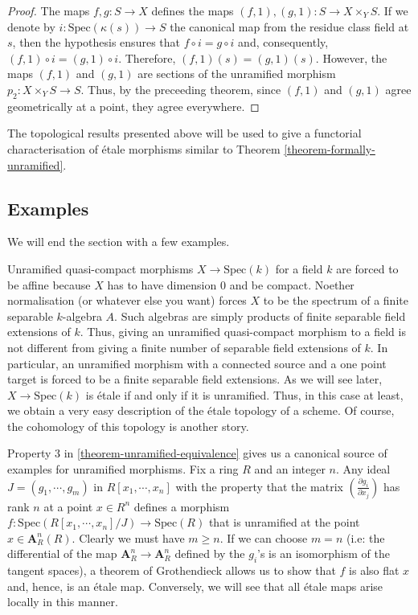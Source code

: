 \begin{proof}
The maps $f,g:S \to X$ defines the maps $(f,1),(g,1):S \to X \times_Y S$. If
we denote by $i:\text{Spec}(\kappa(s)) \to S$ the canonical map from the residue
class field at $s$, then the hypothesis ensures that $f\circ i = g\circ i$
and, consequently, $(f,1)\circ i = (g,1) \circ i$. Therefore,
$(f,1)(s) = (g,1)(s)$. However, the maps $(f,1)$ and $(g,1)$ are sections of
the unramified morphism $p_2:X\times_Y S \to S$. Thus, by the preceeding
theorem, since $(f,1)$ and $(g,1)$ agree geometrically at a point, they agree
everywhere.
\end{proof}

\noindent
The topological results presented above will be used to give a functorial
characterisation of \'etale morphisms similar to Theorem
\ref{theorem-formally-unramified}.

\subsection{Examples}
\label{subsection-examples}

\noindent
We will end the section with a few examples.

\begin{example}
\label{example-etale-field-extensions}
Unramified quasi-compact morphisms $X \to \text{Spec}(k)$ for a field $k$ are forced
to be affine because $X$ has to have dimension $0$ and be compact. Noether
normalisation (or whatever else you want) forces $X$ to be the spectrum of a
finite separable $k$-algebra $A$. Such algebras are simply products of finite
separable field extensions of $k$. Thus, giving an unramified quasi-compact
morphism to a field is not different from giving a finite number of separable
field extensions of $k$. In particular, an unramified morphism with a
connected source and a one point target is forced to be a finite separable
field extensions. As we will see later, $X \to \text{Spec}(k)$ is \'etale if and
only if it is unramified. Thus, in this case at least, we obtain a very easy
description of the \'etale topology of a scheme. Of course, the cohomology of
this topology is another story.
\end{example}

\begin{example}
\label{example-standard-etale}
Property $3$ in \ref{theorem-unramified-equivalence} 
gives us a canonical source of
examples for unramified morphisms. Fix a ring $R$ and an integer $n$. Any
ideal $J = (g_1,\cdots,g_m)$ in $R[x_1,\cdots,x_n]$ with the property that the
matrix $(\frac{\partial g_i}{\partial x_j})$ has rank $n$ at a point
$x \in R^n$ defines a morphism $f:\text{Spec}(R[x_1,\cdots,x_n]/J) \to \text{Spec}(R)$
that is unramified at the point $x \in \mathbf{A}^n_R(R)$. Clearly we must have
$m \geq n$. If we can choose $m = n$ (i.e: the differential of the map
$\mathbf{A}^n_R \to \mathbf{A}^n_R$ defined by the $g_i$'s is an isomorphism of the tangent
spaces), a theorem of Grothendieck allows us to show that $f$ is also flat
$x$ and, hence, is an \'etale map. Conversely, we will see that all \'etale
maps arise locally in this manner.
\end{example}


